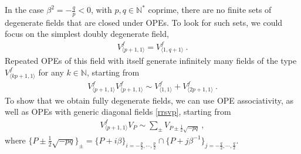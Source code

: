 \documentclass[12pt, a4paper]{article}
\begin{document}
In the case $\beta^2=-\frac{q}{p}<0$, with $p,q\in\mathbb{N}^*$ coprime, there are no finite sets of degenerate fields that are closed under OPEs. To look for such sets, we could focus on the simplest doubly degenerate field, 
\begin{align}
 V^f_{\langle p+1,1\rangle}=V^f_{\langle 1,q+1\rangle}\ .
\end{align}
Repeated OPEs of this field with itself generate infinitely many fields of the type $V^f_{\langle kp+1,1\rangle}$ for any $k\in\mathbb{N}$, starting from
\begin{align}
 V^f_{\langle p+1,1\rangle}V^f_{\langle p+1,1\rangle}\sim V^f_{\langle 1,1\rangle} + V^f_{\langle 2p+1,1\rangle}\ .
 \label{rfppo}
\end{align}
To show that we obtain fully degenerate fields, we can use OPE associativity, as well as OPEs with generic diagonal fields \eqref{rrsvp}, starting from
\begin{align}
 V^f_{\langle p+1,1\rangle}  V_P \sim \sum_{\pm} V_{P\pm \frac12\sqrt{-pq}}\ ,
\end{align}
where $\{P\pm \frac12\sqrt{-pq}\}_\pm = \{P+i\beta\}_{i=-\frac{p}{2},\cdots, \frac{p}{2}} \cap \{P+j\beta^{-1}\}_{j=-\frac{q}{2},\cdots, \frac{q}{2}}$. 
\end{document}
